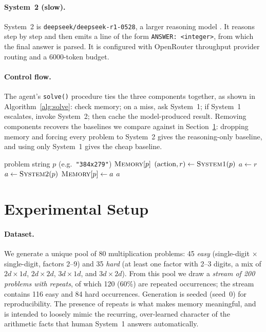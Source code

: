 \documentclass[11pt]{article}
\newcommand{\sysone}{System~1}
\newcommand{\systwo}{System~2}
\begin{document}
\paragraph{\systwo{} (slow).} \systwo{} is
\texttt{deepseek/deepseek-r1-0528}, a larger reasoning model
\citep{deepseek2025r1}. It reasons step by step and then emits a line of the form
\texttt{ANSWER: <integer>}, from which the final answer is parsed. It is
configured with OpenRouter throughput provider routing and a 6000-token budget.

\paragraph{Control flow.} The agent's \texttt{solve()} procedure ties the three
components together, as shown in Algorithm~\ref{alg:solve}: check memory; on a
miss, ask \sysone; if \sysone{} escalates, invoke \systwo; then cache the
model-produced result. Removing components recovers the baselines we compare
against in Section~\ref{sec:setup}: dropping memory and forcing every problem to
\systwo{} gives the reasoning-only baseline, and using only \sysone{} gives the
cheap baseline.

\begin{algorithm}[H]
\caption{\texttt{solve(problem)} --- the full TFaS agent}
\label{alg:solve}
\begin{algorithmic}[1]
\Require problem string $p$ (e.g.\ \texttt{"384x279"})
 
    \State \Return $\textsc{Memory}[p]$
\EndIf
\State $(\text{action}, r) \gets \Call{System1}{p}$ 
    \State $a \gets r$
\Else {}
    \State $a \gets \Call{System2}{p}$ 
\EndIf
\State $\textsc{Memory}[p] \gets a$ 
\State \Return $a$
\end{algorithmic}
\end{algorithm}

\section{Experimental Setup}
\label{sec:setup}

\paragraph{Dataset.} We generate a unique pool of 80 multiplication problems: 45
\emph{easy} (single-digit $\times$ single-digit, factors 2--9) and 35 \emph{hard}
(at least one factor with 2--3 digits, a mix of $2d\times1d$, $2d\times2d$,
$3d\times1d$, and $3d\times2d$). From this pool we draw a \emph{stream of 200
problems with repeats}, of which 120 (60\%) are repeated occurrences; the stream
contains 116 easy and 84 hard occurrences. Generation is seeded (seed~0) for
reproducibility. The presence of repeats is what makes memory meaningful, and is
intended to loosely mimic the recurring, over-learned character of the
arithmetic facts that human System~1 answers automatically.
\end{document}
